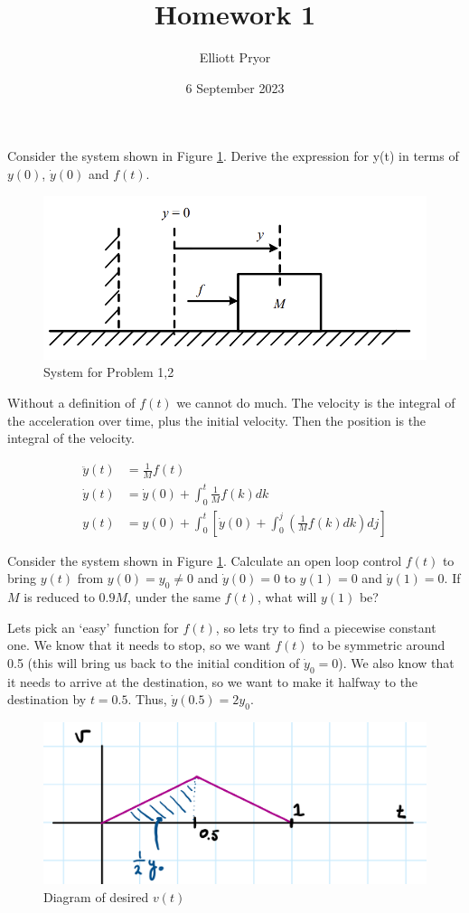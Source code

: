 \documentclass[11pt]{article}
\title{Homework 1}
\author{Elliott Pryor}
\date{6 September 2023}
\begin{document}
\maketitle


Consider the system shown in Figure \ref{fig:1-1}. Derive the expression for y(t) in
terms of $y(0)$, $\dot{y}(0)$ and $f(t)$.

\begin{figure}[h] 
    \centering
    \includegraphics[width=0.55 \linewidth]{fig11.png}
    \caption{System for Problem 1,2}
    \label{fig:1-1}
\end{figure}

\soln

Without a definition of $f(t)$ we cannot do much. 
The velocity is the integral of the acceleration over time, plus the initial velocity.
Then the position is the integral of the velocity.

\begin{align}
    \ddot{y}(t) &= \frac{1}{M} f(t)\\
    \dot{y}(t) &= \dot{y}(0) + \int_0 ^t \frac{1}{M} f(k)dk  \\
    y(t) &= y(0) + \int_0 ^t \left[ \dot{y}(0) + \int_0 ^j \left( \frac{1}{M} f(k)dk \right) dj \right]
\end{align}



Consider the system shown in Figure \ref{fig:1-1}. Calculate an open loop control $f(t)$
to bring $y(t)$ from $y(0) = y_0 \neq 0$ and $\dot{y}(0) = 0$ to $y(1) = 0$ and $\dot{y}(1) = 0$. 
If $M$ is reduced to $0.9M$, under the same $f(t)$, what will $y(1)$ be?

\soln

Lets pick an `easy' function for $f(t)$, so lets try to find a piecewise constant one.
We know that it needs to stop, so we want $f(t)$ to be symmetric around 0.5 (this will bring us back to the initial condition of $\dot{y}_0=0$).
We also know that it needs to arrive at the destination, so we want to make it halfway to the destination by $t=0.5$.
Thus, $\dot{y}(0.5) = 2y_0$.

\begin{figure}[h] 
    \centering
    \includegraphics[width=0.55 \linewidth]{p2}
    \caption{Diagram of desired $v(t)$}
    \label{fig:p2}
\end{figure}
\end{document}

